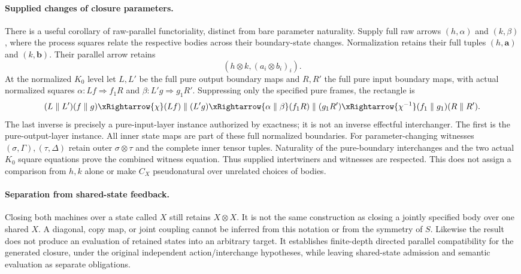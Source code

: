 \documentclass{article}
\begin{document}
\paragraph{Supplied changes of closure parameters.}
There is a useful corollary of raw-parallel functoriality, distinct from bare parameter naturality. Supply full raw arrows $(h,\alpha)$ and $(k,\beta)$, where the process squares relate the respective bodies across their boundary-state changes. Normalization retains their full tuples $(h,\mathbf a)$ and $(k,\mathbf b)$. Their parallel arrow retains
\[
 (h\otimes k,(a_i\otimes b_i)_i).
\]
At the normalized $K_0$ level let $L,L'$ be the full pure output boundary maps and $R,R'$ the full pure input boundary maps, with actual normalized squares $\alpha:Lf\Rightarrow f_1R$ and $\beta:L'g\Rightarrow g_1R'$. Suppressing only the specified pure frames, the rectangle is
\[
 (L\parallel L')(f\parallel g)
 \xRightarrow{\chi}(Lf)\parallel(L'g)
 \xRightarrow{\alpha\parallel\beta}(f_1R)\parallel(g_1R')
 \xRightarrow{\chi^{-1}}(f_1\parallel g_1)(R\parallel R').
\]
The last inverse is precisely a pure-input-layer instance authorized by exactness; it is not an inverse effectful interchanger. The first is the pure-output-layer instance. All inner state maps are part of these full normalized boundaries. For parameter-changing witnesses $(\sigma,\Gamma),(\tau,\Delta)$ retain outer $\sigma\otimes\tau$ and the complete inner tensor tuples. Naturality of the pure-boundary interchanges and the two actual $K_0$ square equations prove the combined witness equation. Thus supplied intertwiners and witnesses are respected. This does not assign a comparison from $h,k$ alone or make $C_X$ pseudonatural over unrelated choices of bodies.

\paragraph{Separation from shared-state feedback.} Closing both machines over a state called $X$ still retains $X\otimes X$. It is not the same construction as closing a jointly specified body over one shared $X$. A diagonal, copy map, or joint coupling cannot be inferred from this notation or from the symmetry of $S$. Likewise the result does not produce an evaluation of retained states into an arbitrary target. It establishes finite-depth directed parallel compatibility for the generated closure, under the original independent action/interchange hypotheses, while leaving shared-state admission and semantic evaluation as separate obligations.
\end{document}

